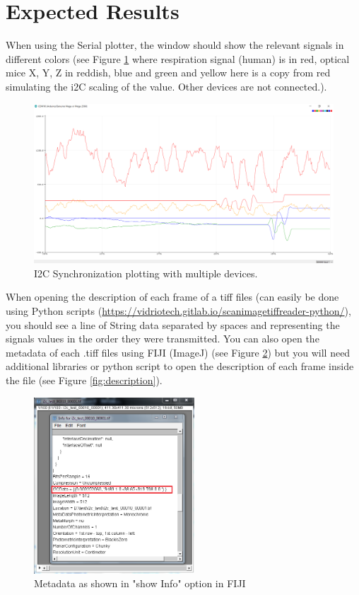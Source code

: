 \documentclass[a4paper]{article}
\begin{document}
\section{Expected Results}
When using the Serial plotter, the window should show the relevant signals in different colors (see Figure \ref{fig:plotting} where respiration signal (human) is in red, optical mice X, Y, Z in reddish, blue and green and yellow here is a copy from red simulating the i2C scaling of the value.
Other devices are not connected.).

\begin{figure}[h!b!t!]
    \centering
    \includegraphics[width=12cm]{images/plotting.png}
    \caption{I2C Synchronization plotting with multiple devices.}
    \label{fig:plotting}
\end{figure}

When opening the description of each frame of a tiff files (can easily be done using Python scripts (\url{https://vidriotech.gitlab.io/scanimagetiffreader-python/}), you should see a line of String data separated by spaces and representing the signals values in the order they were transmitted.
You can also open the metadata of each .tiff files using FIJI (ImageJ) (see Figure \ref{fig:metadata}) but you will need additional libraries or python script to open the description of each frame inside the file (see Figure \ref{fig:description}).

\begin{figure}[h!]
    \centering
    \includegraphics[width = 6cm]{images/metadata.png}
    \caption{Metadata as shown in "show Info" option in FIJI}
    \label{fig:metadata}
\end{figure}
\end{document}
